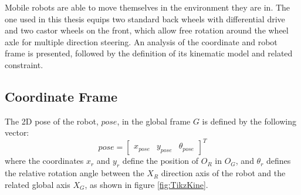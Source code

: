 \noindent Mobile robots are able to move themselves in the environment they are in.
The one used in this thesis equips two standard back wheels with differential drive and two castor wheels on the front, which allow free rotation around the wheel axle for multiple direction steering.
An analysis of the coordinate and robot frame is presented, followed by the definition of its kinematic model and related constraint.

\subsection{Coordinate Frame}

\noindent
The \gls{2D} pose of the robot, ${pose}$, in the global frame $G$ is defined by the following vector:
\begin{equation}
    pose = \begin{bmatrix}x_{pose}&y_{pose}&\theta_{pose}\end{bmatrix}^T
    \label{eq:dof}
\end{equation} where the coordinates $x_r$ and $y_r$ define the position of $O_R$ in $O_G$, and $\theta_r$ defines the relative rotation angle between the $X_R$ direction axis of the robot and the related global axis $X_G$, as shown in figure \ref{fig:TikzKine}.
